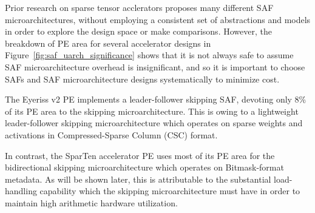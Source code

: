 Prior research on sparse tensor acclerators proposes many different SAF microarchitectures, without employing a consistent set of abstractions and models in order to explore the design space or make comparisons. However, the breakdown of PE area for several accelerator designs in Figure~\ref{fig:saf_uarch_significance} shows that it is not always safe to assume SAF microarchitecture overhead is insignificant, and so it is important to choose SAFs and SAF microarchitecture designs systematically to minimize cost.

The Eyeriss v2\cite{eyerissv2} PE implements a leader-follower skipping SAF, devoting only 8\% of its PE area to the skipping microarchitecture. This is owing to a lightweight leader-follower skipping microarchitecture which operates on sparse weights and activations in Compressed-Sparse Column (CSC) format. 

In contrast, the SparTen\cite{sparten} accelerator PE uses most of its PE area for the bidirectional skipping microarchitecture which operates on Bitmask-format metadata. As will be shown later, this is attributable to the substantial load-handling capability which the skipping microarchitecture must have in order to maintain high arithmetic hardware utilization. 

